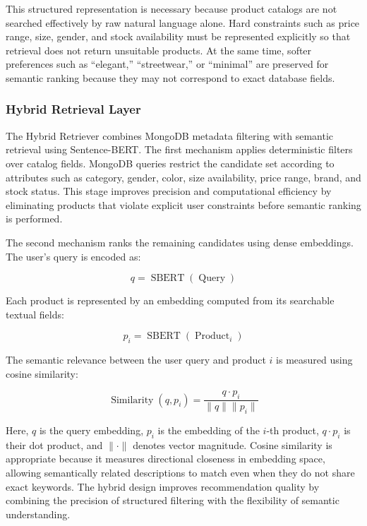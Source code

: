 This structured representation is necessary because product catalogs are not searched effectively by raw natural language alone. Hard constraints such as price range, size, gender, and stock availability must be represented explicitly so that retrieval does not return unsuitable products. At the same time, softer preferences such as ``elegant,'' ``streetwear,'' or ``minimal'' are preserved for semantic ranking because they may not correspond to exact database fields.

\subsubsection*{Hybrid Retrieval Layer}
The Hybrid Retriever combines MongoDB metadata filtering with semantic retrieval using Sentence-BERT. The first mechanism applies deterministic filters over catalog fields. MongoDB queries restrict the candidate set according to attributes such as category, gender, color, size availability, price range, brand, and stock status. This stage improves precision and computational efficiency by eliminating products that violate explicit user constraints before semantic ranking is performed.

The second mechanism ranks the remaining candidates using dense embeddings. The user's query is encoded as:

\begin{equation}
q = \operatorname{SBERT}(\operatorname{Query})
\end{equation}

Each product is represented by an embedding computed from its searchable textual fields:

\begin{equation}
p_i = \operatorname{SBERT}(\operatorname{Product}_i)
\end{equation}

The semantic relevance between the user query and product \(i\) is measured using cosine similarity:

\begin{equation}
\operatorname{Similarity}(q,p_i) = \frac{q \cdot p_i}{\lVert q \rVert \lVert p_i \rVert}
\end{equation}

Here, \(q\) is the query embedding, \(p_i\) is the embedding of the \(i\)-th product, \(q \cdot p_i\) is their dot product, and \(\lVert \cdot \rVert\) denotes vector magnitude. Cosine similarity is appropriate because it measures directional closeness in embedding space, allowing semantically related descriptions to match even when they do not share exact keywords. The hybrid design improves recommendation quality by combining the precision of structured filtering with the flexibility of semantic understanding.

